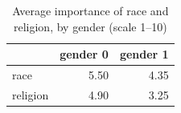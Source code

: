 \begin{table}[htbp]
\centering
\caption{Average importance of race and religion, by gender (scale 1--10)}
\label{tab:q2_race_religion}
\begin{tabular}{lrr}
\toprule
 & gender 0 & gender 1 \\
\midrule
race & 5.50 & 4.35 \\
religion & 4.90 & 3.25 \\
\bottomrule
\end{tabular}
\end{table}
